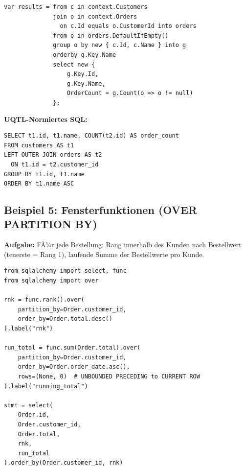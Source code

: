\begin{lstlisting}[style=csharpstyle, caption={Beispiel 4 -- C\# (LEFT JOIN)},
  label=lst:bsp4_cs]
var results = from c in context.Customers
              join o in context.Orders
                on c.Id equals o.CustomerId into orders
              from o in orders.DefaultIfEmpty()
              group o by new { c.Id, c.Name } into g
              orderby g.Key.Name
              select new {
                  g.Key.Id,
                  g.Key.Name,
                  OrderCount = g.Count(o => o != null)
              };
\end{lstlisting}

\begin{successbox}
\textbf{UQTL-Normiertes SQL:}
\begin{lstlisting}[style=sqlstyle, numbers=none]
SELECT t1.id, t1.name, COUNT(t2.id) AS order_count
FROM customers AS t1
LEFT OUTER JOIN orders AS t2
  ON t1.id = t2.customer_id
GROUP BY t1.id, t1.name
ORDER BY t1.name ASC
\end{lstlisting}
\end{successbox}

\subsection{Beispiel 5: Fensterfunktionen (OVER PARTITION BY)}
\label{subsec:bsp5}

\textbf{Aufgabe:} FÃ¼r jede Bestellung: Rang innerhalb des Kunden nach Bestellwert
(teuerste = Rang 1), laufende Summe der Bestellwerte pro Kunde.

\begin{lstlisting}[style=pythonstyle, caption={Beispiel 5 -- Python (Window Functions)},
  label=lst:bsp5_py]
from sqlalchemy import select, func
from sqlalchemy import over

rnk = func.rank().over(
    partition_by=Order.customer_id,
    order_by=Order.total.desc()
).label("rnk")

run_total = func.sum(Order.total).over(
    partition_by=Order.customer_id,
    order_by=Order.order_date.asc(),
    rows=(None, 0)  # UNBOUNDED PRECEDING to CURRENT ROW
).label("running_total")

stmt = select(
    Order.id,
    Order.customer_id,
    Order.total,
    rnk,
    run_total
).order_by(Order.customer_id, rnk)
\end{lstlisting}

